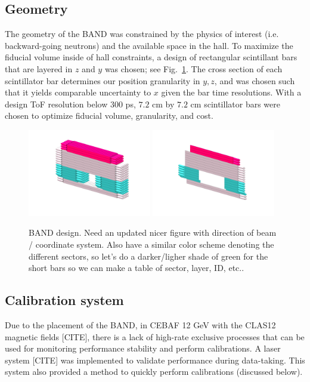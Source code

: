 \documentclass[review]{elsarticle}
\begin{document}
\subsection{Geometry}
The geometry of the BAND was constrained by the physics of interest (i.e. backward-going neutrons) \cite{Emcsrcdeens} and the available space in the hall. To
maximize the fiducial volume inside of hall constraints, a design of rectangular scintillant bars that are layered in $z$ and $y$ was chosen; see Fig.~\ref{fig:design}.
The cross section of each scintillator bar determines our position granularity in $y,z$, and was chosen such that it yields comparable uncertainty to $x$ given the bar 
time resolutions. With a design ToF resolution below $300$ \si{\pico\second}, $7.2$ \si{\centi\meter} by $7.2$ \si{\centi\meter} scintillator bars were chosen to optimize
fiducial volume, granularity, and cost.
\begin{figure}[h]
	\centering
		\includegraphics[width=0.48\textwidth]{MAIN_DETECTOR_COLORED_2.png}
		\includegraphics[width=0.48\textwidth]{VETO_DETECTOR_COLORED_2.png}
		\caption{BAND design. Need an updated nicer figure with direction of beam / coordinate system. Also have a similar 
		color scheme denoting the different sectors, so let's do a darker/ligher shade of green for the short bars so we can make 
		a table of sector, layer, ID, etc..}
		\label{fig:design}
\end{figure}

\subsection{Calibration system}
Due to the placement of the BAND, in CEBAF 12 \si{\giga\electronvolt} with the CLAS12 magnetic fields [{\color{red}CITE}], there is a lack of high-rate exclusive processes 
that can be used for monitoring performance stability and perform calibrations. A laser system [{\color{red}CITE}] was implemented to validate performance during data-taking. This system also 
provided a method to quickly perform calibrations (discussed below).
\end{document}

